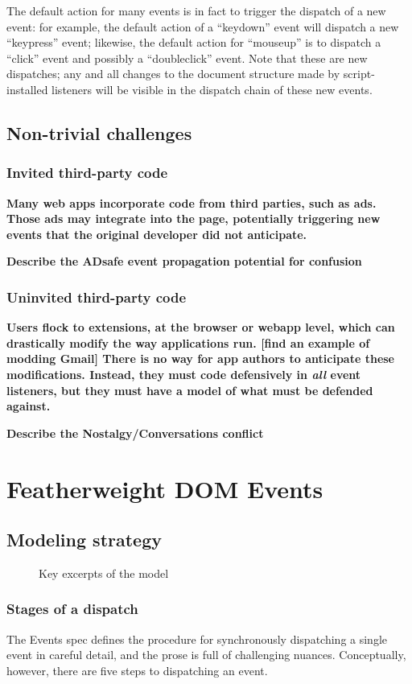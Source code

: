 \documentclass[letterpaper,10pt,twocolumn]{article}
\begin{document}
The default action for many events is in fact to trigger the dispatch
of a new event: for example, the default action of a ``keydown'' event
will dispatch a new ``keypress'' event; likewise, the default action
for ``mouseup'' is to dispatch a ``click'' event and possibly a
``doubleclick'' event.  Note that these are new dispatches; any and
all changes to the document structure made by script-installed
listeners will be visible in the dispatch chain of these new events.

\subsection{Non-trivial challenges}
\subsubsection{Invited third-party code}
\textbf{Many web apps incorporate code from third parties, such as
  ads.  Those ads may integrate into the page, potentially triggering
  new events that the original developer did not anticipate.}
\lipsum[1]

\textbf{Describe the ADsafe event propagation potential for confusion}
\lipsum[2]

\subsubsection{Uninvited third-party code}
\textbf{Users flock to extensions, at the browser or webapp level,
  which can drastically modify the way applications run. [find an
  example of modding Gmail]  There is no way for app authors to
  anticipate these modifications.  Instead, they must code defensively
  in \emph{all} event listeners, but they must have a model of what
  must be defended against.}
\lipsum[1]

\textbf{Describe the Nostalgy/Conversations conflict}
\lipsum[3-6]

\section{Featherweight DOM Events}
\subsection{Modeling strategy}
\begin{figure}
  \lipsum[1-3]
  \caption{Key excerpts of the model}
\end{figure}
\subsubsection{Stages of a dispatch} The Events spec defines the procedure
for synchronously dispatching a single event in careful detail, and
the prose is full of challenging nuances.  Conceptually, however,
there are five steps to dispatching an event.
\end{document}
